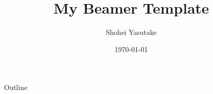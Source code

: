 \documentclass[11pt]{beamer}
\title{My Beamer Template}
\author{Shohei Yasutake}
\institute{Tokyo Institute of Technology}
\date{\today}
\begin{document}
\maketitle

\begin{frame}{Outline}
  \tableofcontents
\end{frame}


\end{document}
